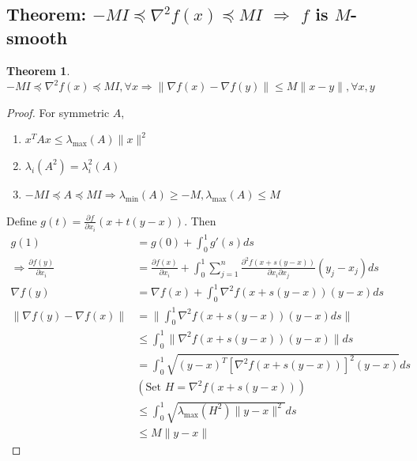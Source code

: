 \documentclass[11pt,a4paper]{article}
\newtheorem{theorem}{Theorem}
\begin{document}
\subsection{Theorem: $-MI\preceq\nabla^2 f(x)\preceq  MI$ $\Rightarrow$ $f$ is $M$-smooth}
\begin{theorem}
$-MI\preceq\nabla^2 f(x)\preceq  MI, \forall x \Rightarrow \|\nabla f(x)-\nabla f(y)\|\leq M\|x-y\|,\forall x,y$
\end{theorem}
\begin{proof}
For symmetric $A$,
\begin{enumerate}
    \item $x^TAx\leq \lambda_{\max}(A)\|x\|^2$
    \item $\lambda_{i}(A^2)=\lambda_i^2(A)$
    \item $-MI\preceq A\preceq  MI \Rightarrow \lambda_{\min}(A)\geq-M,\lambda_{\max}(A)\leq M$
\end{enumerate}
Define $g(t)=\frac{\partial f}{\partial x_i}(x+t(y-x))$. Then
\begin{equation}
    \begin{aligned}
        g(1)&=g(0)+\int_0^1g'(s)ds\\
        \Rightarrow	\frac{\partial f(y)}{\partial x_i}&=\frac{\partial f(x)}{\partial x_i}+\int_0^1\sum_{j=1}^n \frac{\partial^2 f(x+s(y-x))}{\partial x_i\partial x_j}(y_j-x_j)ds\\
        \nabla f(y)&=\nabla f(x)+\int_0^1 \nabla^2 f(x+s(y-x))(y-x)ds\\
        \|\nabla f(y)-\nabla f(x)\|&=\|\int_0^1 \nabla^2 f(x+s(y-x))(y-x)ds\|\\
        &\leq \int_0^1\|\nabla^2 f(x+s(y-x))(y-x)\|ds\\
        &=\int_0^1\sqrt{(y-x)^T[\nabla^2 f(x+s(y-x))]^2(y-x)}ds\\
        &(\text{Set }H=\nabla^2 f(x+s(y-x)))\\
        &\leq \int_0^1\sqrt{\lambda_{\max}(H^2)\|y-x\|^2}ds\\
        &\leq M\|y-x\|
    \end{aligned}
    \nonumber
\end{equation}
\end{proof}
\end{document}
